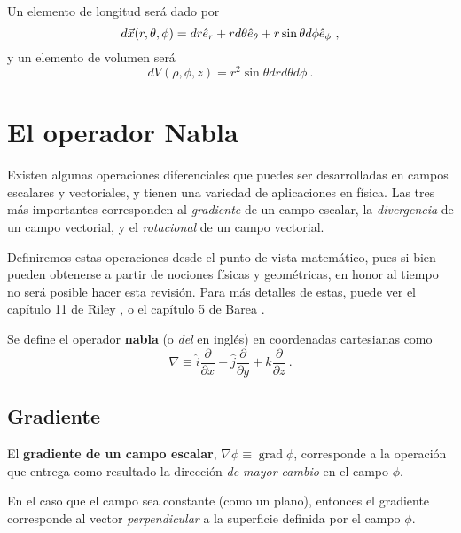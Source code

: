Un elemento de longitud será dado por 
\begin{equation}
    d\vec{x}(r, \theta, \phi) = dr \hat{e}_r + r d\theta \hat{e}_\theta + r \sin \theta d\phi \hat{e}_\phi \ ,
\end{equation}
y un elemento de volumen será
\begin{equation}
    dV(\rho, \phi, z) = r^2 \sin \theta dr d\theta d\phi \ .
\end{equation}


\section{El operador Nabla}

Existen algunas operaciones diferenciales que puedes ser desarrolladas en campos escalares y vectoriales, y tienen una variedad de aplicaciones en física. Las tres más importantes corresponden al \emph{gradiente} de un campo escalar, la \emph{divergencia} de un campo vectorial, y el \emph{rotacional} de un campo vectorial.

Definiremos estas operaciones desde el punto de vista matemático, pues si bien pueden obtenerse a partir de nociones físicas y geométricas, en honor al tiempo no será posible hacer esta revisión. Para más detalles de estas, puede ver el capítulo 11 de Riley \cite{Riley}, o el capítulo 5 de Barea \cite{Barea}.

\begin{defi}
    Se define el operador \textbf{nabla} (o \emph{del} en inglés) en coordenadas cartesianas como 
    \begin{equation}
        \nabla \equiv \hat{i} \frac{\partial}{\partial x} + \hat{j} \frac{\partial}{\partial y} + \hat{k} \frac{\partial}{\partial z} \ .
    \end{equation}
\end{defi}

\subsection{Gradiente}

\begin{defi}
    El \textbf{gradiente de un campo escalar}, $\nabla \phi \equiv \operatorname{grad}\phi$, corresponde a la operación que entrega como resultado la dirección \emph{de mayor cambio} en el campo $\phi$.

    En el caso que el campo sea constante (como un plano), entonces el gradiente corresponde al vector \emph{perpendicular} a la superficie definida por el campo $\phi$. 
\end{defi}


